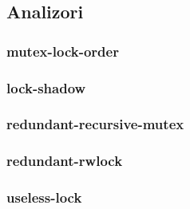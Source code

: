 \subsection{Analizori}\label{analyzers}


\subsubsection{mutex-lock-order}


\subsubsection{lock-shadow}


\subsubsection{redundant-recursive-mutex}


\subsubsection{redundant-rwlock}


\subsubsection{useless-lock}

